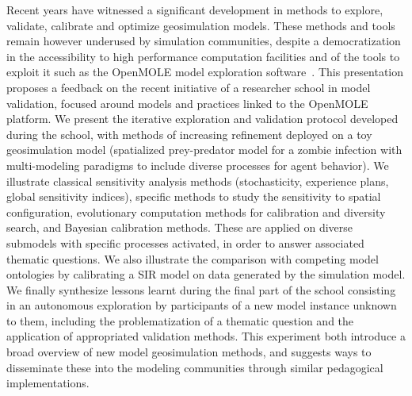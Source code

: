 \documentclass[11pt]{article}
\begin{document}
Recent years have witnessed a significant development in methods to explore, validate, calibrate and optimize geosimulation models. These methods and tools remain however underused by simulation communities, despite a democratization in the accessibility to high performance computation facilities and of the tools to exploit it such as the OpenMOLE model exploration software~\citep{reuillon2013openmole}. This presentation proposes a feedback on the recent initiative of a researcher school in model validation, focused around models and practices linked to the OpenMOLE platform. We present the iterative exploration and validation protocol developed during the school, with methods of increasing refinement deployed on a toy geosimulation model (spatialized prey-predator model for a zombie infection with multi-modeling paradigms to include diverse processes for agent behavior). We illustrate classical sensitivity analysis methods (stochasticity, experience plans, global sensitivity indices), specific methods to study the sensitivity to spatial configuration, evolutionary computation methods for calibration and diversity search, and Bayesian calibration methods. These are applied on diverse submodels with specific processes activated, in order to answer associated thematic questions. We also illustrate the comparison with competing model ontologies by calibrating a SIR model on data generated by the simulation model. We finally synthesize lessons learnt during the final part of the school consisting in an autonomous exploration by participants of a new model instance unknown to them, including the problematization of a thematic question and the application of appropriated validation methods. This experiment both introduce a broad overview of new model geosimulation methods, and suggests ways to disseminate these into the modeling communities through similar pedagogical implementations.












\end{document}
